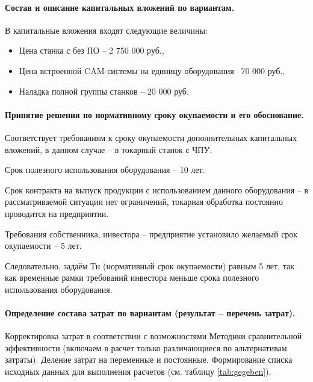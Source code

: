 \paragraph{Состав и описание капитальных вложений по вариантам.} В капитальные вложения входят следующие величины:

\begin{itemize}
	\item Цена станка с без ПО – 2 750 000 руб.,
	\item Цена встроенной CAM-системы на единицу оборудования– 70 000 руб.,
	\item Наладка полной группы станков – 20 000 руб.
\end{itemize}

\paragraph{Принятие решения по нормативному сроку окупаемости и его обоснование.} Соответствует требованиям к сроку окупаемости дополнительных капитальных вложений, в данном случае – в токарный станок с ЧПУ.

Срок полезного использования оборудования – 10 лет.

Срок контракта на выпуск продукции с использованием данного оборудования – в рассматриваемой ситуации нет ограничений, токарная обработка постоянно проводится на предприятии.

Требования собственника, инвестора – предприятие установило желаемый срок окупаемости – 5 лет.

Следовательно, задаём Тн (нормативный срок окупаемости) равным 5 лет, так как временные рамки требований инвестора меньше срока полезного использования оборудования.

\paragraph{Определение состава затрат по вариантам (результат – перечень затрат).} Корректировка затрат в соответствии с возможностями Методики сравнительной эффективности (включаем в расчет только различающиеся по альтернативам затраты). Деление затрат на переменные и постоянные. Формирование списка исходных данных для выполнения расчетов (см. таблицу \ref{tab:gegeben}).

